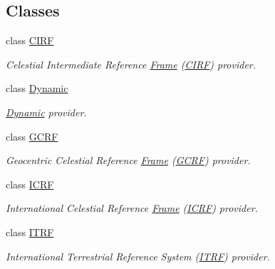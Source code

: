 \subsection*{Classes}
\begin{DoxyCompactItemize}
\item 
class \hyperlink{classostk_1_1physics_1_1coord_1_1frame_1_1provider_1_1_c_i_r_f}{C\+I\+RF}
\begin{DoxyCompactList}\small\item\em Celestial Intermediate Reference \hyperlink{classostk_1_1physics_1_1coord_1_1_frame}{Frame} (\hyperlink{classostk_1_1physics_1_1coord_1_1frame_1_1provider_1_1_c_i_r_f}{C\+I\+RF}) provider. \end{DoxyCompactList}\item 
class \hyperlink{classostk_1_1physics_1_1coord_1_1frame_1_1provider_1_1_dynamic}{Dynamic}
\begin{DoxyCompactList}\small\item\em \hyperlink{classostk_1_1physics_1_1coord_1_1frame_1_1provider_1_1_dynamic}{Dynamic} provider. \end{DoxyCompactList}\item 
class \hyperlink{classostk_1_1physics_1_1coord_1_1frame_1_1provider_1_1_g_c_r_f}{G\+C\+RF}
\begin{DoxyCompactList}\small\item\em Geocentric Celestial Reference \hyperlink{classostk_1_1physics_1_1coord_1_1_frame}{Frame} (\hyperlink{classostk_1_1physics_1_1coord_1_1frame_1_1provider_1_1_g_c_r_f}{G\+C\+RF}) provider. \end{DoxyCompactList}\item 
class \hyperlink{classostk_1_1physics_1_1coord_1_1frame_1_1provider_1_1_i_c_r_f}{I\+C\+RF}
\begin{DoxyCompactList}\small\item\em International Celestial Reference \hyperlink{classostk_1_1physics_1_1coord_1_1_frame}{Frame} (\hyperlink{classostk_1_1physics_1_1coord_1_1frame_1_1provider_1_1_i_c_r_f}{I\+C\+RF}) provider. \end{DoxyCompactList}\item 
class \hyperlink{classostk_1_1physics_1_1coord_1_1frame_1_1provider_1_1_i_t_r_f}{I\+T\+RF}
\begin{DoxyCompactList}\small\item\em International Terrestrial Reference System (\hyperlink{classostk_1_1physics_1_1coord_1_1frame_1_1provider_1_1_i_t_r_f}{I\+T\+RF}) provider. \end{DoxyCompactList}\item 

\end{DoxyCompactItemize}
